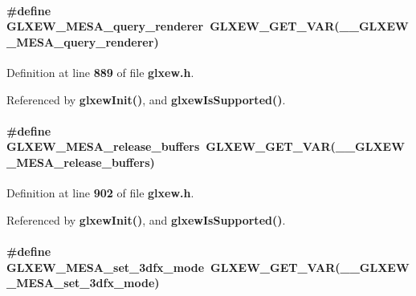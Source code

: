 \paragraph[{G\+L\+X\+E\+W\+\_\+\+M\+E\+S\+A\+\_\+query\+\_\+renderer}]{\setlength{\rightskip}{0pt plus 5cm}\#define G\+L\+X\+E\+W\+\_\+\+M\+E\+S\+A\+\_\+query\+\_\+renderer~{\bf G\+L\+X\+E\+W\+\_\+\+G\+E\+T\+\_\+\+V\+AR}({\bf \+\_\+\+\_\+\+G\+L\+X\+E\+W\+\_\+\+M\+E\+S\+A\+\_\+query\+\_\+renderer})}\label{glxew_8h_addbc014827b8231338b026caedf64af6}


Definition at line {\bf 889} of file {\bf glxew.\+h}.



Referenced by {\bf glxew\+Init()}, and {\bf glxew\+Is\+Supported()}.

\paragraph[{G\+L\+X\+E\+W\+\_\+\+M\+E\+S\+A\+\_\+release\+\_\+buffers}]{\setlength{\rightskip}{0pt plus 5cm}\#define G\+L\+X\+E\+W\+\_\+\+M\+E\+S\+A\+\_\+release\+\_\+buffers~{\bf G\+L\+X\+E\+W\+\_\+\+G\+E\+T\+\_\+\+V\+AR}({\bf \+\_\+\+\_\+\+G\+L\+X\+E\+W\+\_\+\+M\+E\+S\+A\+\_\+release\+\_\+buffers})}\label{glxew_8h_aca69096474820fdcc18b3852a4ee009b}


Definition at line {\bf 902} of file {\bf glxew.\+h}.



Referenced by {\bf glxew\+Init()}, and {\bf glxew\+Is\+Supported()}.

\paragraph[{G\+L\+X\+E\+W\+\_\+\+M\+E\+S\+A\+\_\+set\+\_\+3dfx\+\_\+mode}]{\setlength{\rightskip}{0pt plus 5cm}\#define G\+L\+X\+E\+W\+\_\+\+M\+E\+S\+A\+\_\+set\+\_\+3dfx\+\_\+mode~{\bf G\+L\+X\+E\+W\+\_\+\+G\+E\+T\+\_\+\+V\+AR}({\bf \+\_\+\+\_\+\+G\+L\+X\+E\+W\+\_\+\+M\+E\+S\+A\+\_\+set\+\_\+3dfx\+\_\+mode})}\label{glxew_8h_a850f527377ac64f0722841c235ac2e11}


